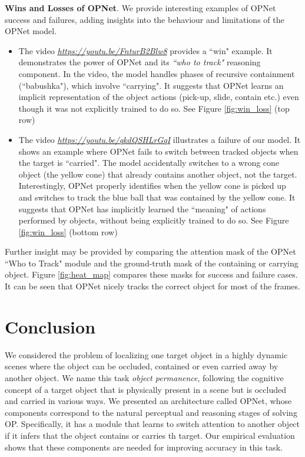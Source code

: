 \documentclass[]{llncs}
\begin{document}
\textbf{Wins and Losses of OPNet}.
 We provide interesting examples of OPNet success and failures, adding insights into the behaviour and limitations of the OPNet model.

 
 \begin{itemize}
     \item The video \href{https://youtu.be/FnturB2Blw8}{\textit{https://youtu.be/FnturB2Blw8}} provides a ``win" example. It demonstrates the power of OPNet and its \textit{``who to track"} reasoning component. In the video, the model handles phases of recursive containment (``babushka"), which involve ``carrying". It suggests that OPNet learns an implicit representation of the object actions (pick-up, slide, contain etc.) even though it was not explicitly trained to do so. See Figure \ref{fig:win_loss} (top row)
     
     \item The video \href{https://youtu.be/qkdQSHLrGqI}{\textit{https://youtu.be/qkdQSHLrGqI}} illustrates a failure of our model. It shows an example where OPNet fails to switch between tracked objects when the target is ``carried". The model accidentally switches to a wrong cone object (the yellow cone) that already contains another object, not the target. Interestingly, OPNet properly identifies when the yellow cone is picked up and switches to track the blue ball that was contained by the yellow cone. It suggests that OPNet has implicitly learned the ``meaning" of actions performed by objects, without being explicitly trained to do so. See Figure \ref{fig:win_loss} (bottom row)
 \end{itemize}
 
Further insight may be provided by comparing the attention mask of the OPNet ``Who to Track" module and the ground-truth mask of the containing or carrying object. Figure \ref{fig:heat_map} compares these masks for success and failure cases. It can be seen that OPNet nicely tracks the correct object for most of the frames.

\section{Conclusion}
We considered the problem of localizing one target object in a highly dynamic scenes where the object can be occluded, contained or even carried away by another object. We name this task \textit{object permanence}, following the cognitive concept of a target object that is physically present in a scene but is occluded and carried in various ways. We presented an architecture called OPNet, whose components correspond to the natural perceptual and reasoning stages of solving OP. Specifically, it has a module that learns to switch attention to another object if it infers that the object contains or carries th target. Our empirical evaluation shows that these components are needed for improving accuracy in this task. 
\end{document}
